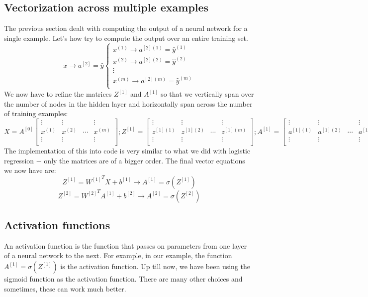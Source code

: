 \documentclass{article}[a4paper,12pt]
\theoremstyle{definition}
\begin{document}
\subsection{Vectorization across multiple examples}
The previous section dealt with computing the output of a neural network for a single example. Let's how try to compute the output over an entire training set.
$$x\longrightarrow a^{[2]}=\hat{y} \left\{
\begin{array}{l}
    x^{(1)}\longrightarrow a^{[2](1)}=\hat{y}^{(1)} \\
    x^{(2)}\longrightarrow a^{[2](2)}=\hat{y}^{(2)} \\
    \vdots \\
    x^{(m)}\longrightarrow a^{[2](m)}=\hat{y}^{(m)}\\
\end{array}{}\right.$$
We now have to refine the matrices $Z^{[1]}$ and $A^{[1]}$ so that we vertically span over the number of nodes in the hidden layer and horizontally span across the number of training examples:
$$X=A^{[0]}
\begin{bmatrix}
	\vdots & \vdots & & \vdots\\
	x^{(1)} & x^{(2)} & \cdots & x^{(m)}\\
	\vdots & \vdots & & \vdots\\
\end{bmatrix};
Z^{[1]}=
\begin{bmatrix}
	\vdots & \vdots & & \vdots\\
	z^{[1](1)} & z^{[1](2)} & \cdots & z^{[1](m)}\\
	\vdots & \vdots & & \vdots\\
\end{bmatrix};
A^{[1]}=
\begin{bmatrix}
	\vdots & \vdots & & \vdots\\
	a^{[1](1)} & a^{[1](2)} & \cdots & a^{[1](m)}\\
	\vdots & \vdots & & \vdots\\
\end{bmatrix}
$$
The implementation of this into code is very similar to what we did with logistic regression $-$ only the matrices are of a bigger order. The final vector equations we now have are:
$$Z^{[1]}={W^{[1]}}^TX+b^{[1]}\longrightarrow A^{[1]}=\sigma(Z^{[1]})$$
$$Z^{[2]}={W^{[2]}}^TA^{[1]}+b^{[2]}\longrightarrow A^{[2]}=\sigma(Z^{[2]})$$
\subsection{Activation functions}
An activation function is the function that passes on parameters from one layer of a neural network to the next. For example, in our example, the function $A^{[1]}=\sigma(Z^{[1]})$ is the activation function. Up till now, we have been using the sigmoid function as the activation function. There are many other choices and sometimes, these can work much better.
\vspace{6pt}
\end{document}
